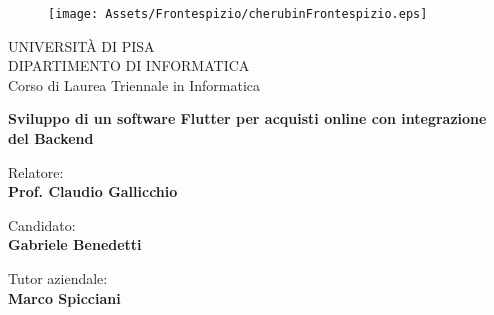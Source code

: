 \begin{titlepage}
\begin{figure}[!htb]
    \centering
    \texttt{[image: Assets/Frontespizio/cherubinFrontespizio.eps]}
\end{figure}

\begin{center}
    \LARGE{UNIVERSITÀ DI PISA}
    \vspace{5mm}
    \\ \large{DIPARTIMENTO DI INFORMATICA}
    \vspace{5mm}
    \\ \LARGE{Corso di Laurea Triennale in Informatica}
\end{center}

\vspace{15mm}
\begin{center}
    {\Large{\bf \vspace{5mm} Sviluppo di un software Flutter per acquisti online con integrazione del Backend }}
    
\end{center}
\vspace{30mm}

\begin{minipage}[t]{0.47\textwidth}
	{\large{Relatore:}{\normalsize\vspace{3mm}
	\bf\\ \large{Prof. Claudio Gallicchio} \normalsize\vspace{3mm}}}
\end{minipage}
\hfill
\begin{minipage}[t]{0.47\textwidth}\raggedleft
	{\large{Candidato:}{\normalsize\vspace{3mm} \bf\\ \large{Gabriele Benedetti}\vspace{10mm}}}
\end{minipage}

\begin{minipage}[t]{0.47\textwidth}
	{\large{Tutor aziendale:}{\normalsize\vspace{3mm}
	\bf\\ \large{Marco Spicciani} \normalsize\vspace{3mm}}}
\end{minipage}

\vspace{20mm}
\hrulefill
\\

\end{titlepage}